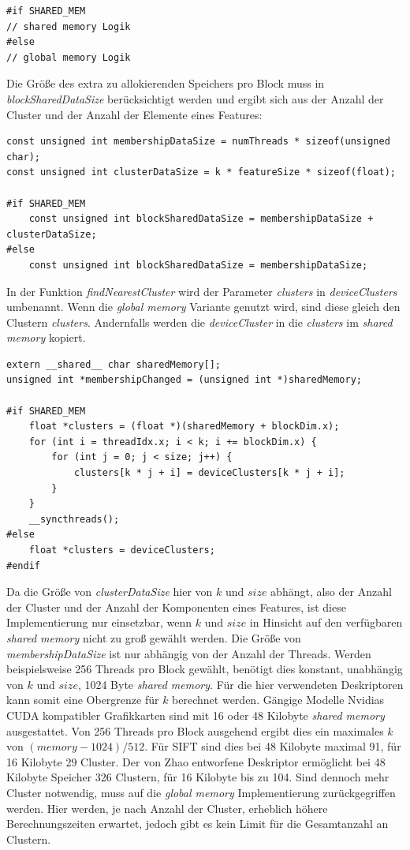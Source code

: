 \begin{lstlisting}[style=CUDA]
#if SHARED_MEM
// shared memory Logik
#else
// global memory Logik
\end{lstlisting}

Die Größe des extra zu allokierenden Speichers pro Block muss in \textit{blockSharedDataSize} berücksichtigt werden und ergibt sich aus der Anzahl der Cluster und der Anzahl der Elemente eines Features:

\begin{lstlisting}[style=CUDA]
const unsigned int membershipDataSize = numThreads * sizeof(unsigned char);
const unsigned int clusterDataSize = k * featureSize * sizeof(float);

#if SHARED_MEM
    const unsigned int blockSharedDataSize = membershipDataSize + clusterDataSize;
#else
	const unsigned int blockSharedDataSize = membershipDataSize;
\end{lstlisting}

In der Funktion \textit{findNearestCluster} wird der Parameter \textit{clusters} in \textit{deviceClusters} umbenannt. Wenn die \textit{global memory} Variante genutzt wird, sind diese gleich den Clustern \textit{clusters}. Andernfalls werden die \textit{deviceCluster} in die \textit{clusters} im \textit{shared memory} kopiert.

\begin{lstlisting}[style=CUDA]
extern __shared__ char sharedMemory[];
unsigned int *membershipChanged = (unsigned int *)sharedMemory;
    
#if SHARED_MEM
	float *clusters = (float *)(sharedMemory + blockDim.x);
	for (int i = threadIdx.x; i < k; i += blockDim.x) {
  		for (int j = 0; j < size; j++) {
    		clusters[k * j + i] = deviceClusters[k * j + i];
		}
	}
	__syncthreads();
#else
	float *clusters = deviceClusters;
#endif
\end{lstlisting}

Da die Größe von \textit{clusterDataSize} hier von $k$ und $size$ abhängt, also der Anzahl der Cluster und der Anzahl der Komponenten eines Features, ist diese Implementierung nur einsetzbar, wenn $k$ und $size$ in Hinsicht auf den verfügbaren \textit{shared memory} nicht zu groß gewählt werden. Die Größe von \textit{membershipDataSize} ist nur abhängig von der Anzahl der Threads. Werden beispielsweise 256 Threads pro Block gewählt, benötigt dies konstant, unabhängig von $k$ und $size$, 1024 Byte \textit{shared memory}. Für die hier verwendeten Deskriptoren kann somit eine Obergrenze für $k$ berechnet werden. Gängige Modelle Nvidias CUDA kompatibler Grafikkarten sind mit 16 oder 48 Kilobyte \textit{shared memory} ausgestattet. Von 256 Threads pro Block ausgehend ergibt dies ein maximales $k$ von $(memory - 1024) / 512$. Für SIFT sind dies bei 48 Kilobyte maximal 91, für 16 Kilobyte 29 Cluster. Der von Zhao entworfene Deskriptor ermöglicht bei 48 Kilobyte Speicher 326 Clustern, für 16 Kilobyte bis zu 104. Sind dennoch mehr Cluster notwendig, muss auf die \textit{global memory} Implementierung zurückgegriffen werden. Hier werden, je nach Anzahl der Cluster, erheblich höhere Berechnungszeiten erwartet, jedoch gibt es kein Limit für die Gesamtanzahl an Clustern.